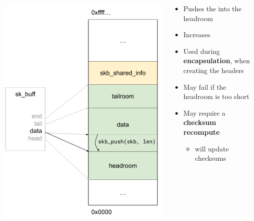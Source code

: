 \begin{frame}{}
	\begin{columns}
		\begin{column}{0.4\textwidth}
			\includegraphics[width=\textwidth]{slides/networking-skb/skb_push.pdf}
		\end{column}
		\begin{column}{0.6\textwidth}
			\begin{itemize}
				\item Pushes the  into the headroom
				\item Increases 
				\item Used during \textbf{encapsulation}, when creating the headers
				\item May fail if the headroom is too short
				\item May require a \textbf{checksum recompute}
					\begin{itemize}
						\item {} will update checksums
					\end{itemize}

			\end{itemize}
		\end{column}
	\end{columns}
\end{frame}

